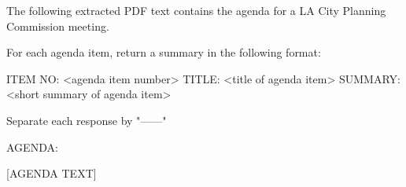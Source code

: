 
The following extracted PDF text contains the agenda for a LA City Planning Commission meeting. 

For each agenda item, return a summary in the following format:

ITEM NO: <agenda item number>
TITLE: <title of agenda item>
SUMMARY: <short summary of agenda item>

Separate each response by "------"

AGENDA:

[AGENDA TEXT]
